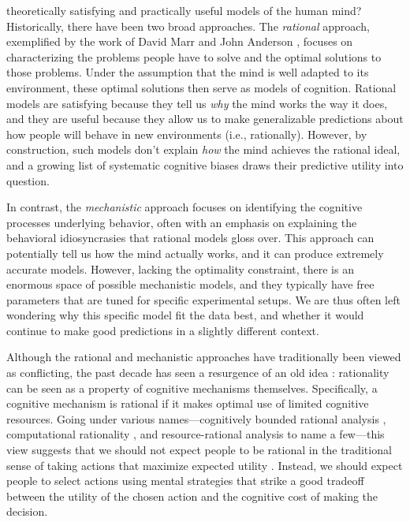 \label{introduction}

 theoretically satisfying and practically useful models of the human mind? Historically, there have been two broad approaches. The \emph{rational} approach, exemplified by the work of David Marr \citeyearpar{marr1982vision} and John Anderson \citeyearpar{anderson1990adaptive}, focuses on characterizing the problems people have to solve and the optimal solutions to those problems. Under the assumption that the mind is well adapted to its environment, these optimal solutions then serve as models of cognition. Rational models are satisfying because they tell us \emph{why} the mind works the way it does, and they are useful because they allow us to make generalizable predictions about how people will behave in new environments (i.e., rationally). However, by construction, such models don't explain \emph{how} the mind achieves the rational ideal, and a growing list of systematic cognitive biases \citep{kahneman2011thinking} draws their predictive utility into question. 

In contrast, the \emph{mechanistic} approach focuses on identifying the cognitive processes underlying behavior, often with an emphasis on explaining the behavioral idiosyncrasies that rational models gloss over. This approach can potentially tell us how the mind actually works, and it can produce extremely accurate models. However, lacking the optimality constraint, there is an enormous space of possible mechanistic models, and they typically have free parameters that are tuned for specific experimental setups. We are thus often left wondering why this specific model fit the data best, and whether it would continue to make good predictions in a slightly different context.

Although the rational and mechanistic approaches have traditionally been viewed as conflicting, the past decade has seen a resurgence of an old idea \citep{simon1955behavioral}: rationality can be seen as a property of cognitive mechanisms themselves. Specifically, a cognitive mechanism is rational if it makes optimal use of limited cognitive resources. Going under various names---cognitively bounded rational analysis \citep{howes2009rational}, computational rationality \citep{lewis2014computational,gershman2015computational}, and resource-rational analysis \citep{griffiths2015rational,lieder2020resourcerational} to name a few---this view suggests that we should not expect people to be rational in the traditional sense of taking actions that maximize expected utility \citep{vonneumann1944theory}. Instead, we should expect people to select actions using mental strategies that strike a good tradeoff between the utility of the chosen action and the cognitive cost of making the decision.

